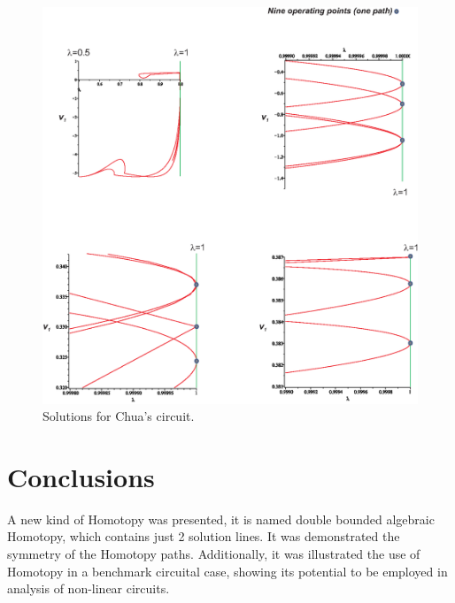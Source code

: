\documentclass[conference,letterpaper,onecolumn]{IEEEtran}
\begin{document}
\begin{figure}[hbtp]
\centering
\includegraphics[scale=0.4]{fig/chuanew.eps}
\caption{Solutions for Chua's circuit.}
\label{chuaf}
\end{figure}



\section{Conclusions}

A new kind of Homotopy was presented, it is named double bounded algebraic Homotopy, which contains just 2 solution lines. It was demonstrated the symmetry of the Homotopy paths. 
Additionally, it was illustrated the use of Homotopy in a benchmark circuital case, showing its potential to be employed in analysis of non-linear circuits.



\end{document}
